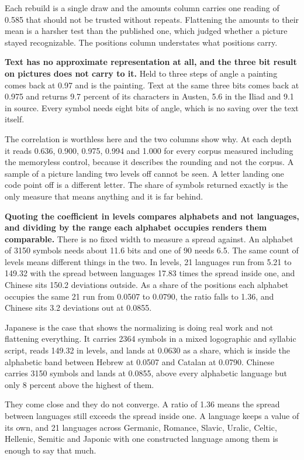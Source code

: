 Each rebuild is a single draw and the amounts column carries one reading of 0.585 that should not be trusted without repeats. Flattening the amounts to their mean is a harsher test than the published one, which judged whether a picture stayed recognizable. The positions column understates what positions carry.

\textbf{Text has no approximate representation at all, and the three bit result on pictures does not carry to it.} Held to three steps of angle a painting comes back at 0.97 and is the painting. Text at the same three bits comes back at 0.975 and returns 9.7 percent of its characters in Austen, 5.6 in the Iliad and 9.1 in source. Every symbol needs eight bits of angle, which is no saving over the text itself.

The correlation is worthless here and the two columns show why. At each depth it reads 0.636, 0.900, 0.975, 0.994 and 1.000 for every corpus measured including the memoryless control, because it describes the rounding and not the corpus. A sample of a picture landing two levels off cannot be seen. A letter landing one code point off is a different letter. The share of symbols returned exactly is the only measure that means anything and it is far behind.

\textbf{Quoting the coefficient in levels compares alphabets and not languages, and dividing by the range each alphabet occupies renders them comparable.} There is no fixed width to measure a spread against. An alphabet of 3150 symbols needs about 11.6 bits and one of 90 needs 6.5. The same count of levels means different things in the two. In levels, 21 languages run from 5.21 to 149.32 with the spread between languages 17.83 times the spread inside one, and Chinese sits 150.2 deviations outside. As a share of the positions each alphabet occupies the same 21 run from 0.0507 to 0.0790, the ratio falls to 1.36, and Chinese sits 3.2 deviations out at 0.0855.

Japanese is the case that shows the normalizing is doing real work and not flattening everything. It carries 2364 symbols in a mixed logographic and syllabic script, reads 149.32 in levels, and lands at 0.0630 as a share, which is inside the alphabetic band between Hebrew at 0.0507 and Catalan at 0.0790. Chinese carries 3150 symbols and lands at 0.0855, above every alphabetic language but only 8 percent above the highest of them.

They come close and they do not converge. A ratio of 1.36 means the spread between languages still exceeds the spread inside one. A language keeps a value of its own, and 21 languages across Germanic, Romance, Slavic, Uralic, Celtic, Hellenic, Semitic and Japonic with one constructed language among them is enough to say that much.

